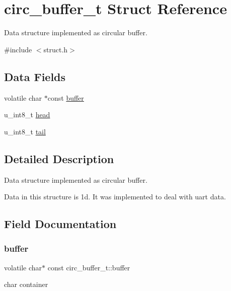 \hypertarget{structcirc__buffer__t}{}\section{circ\+\_\+buffer\+\_\+t Struct Reference}
\label{structcirc__buffer__t}


Data structure implemented as circular buffer.  




{\ttfamily \#include $<$struct.\+h$>$}

\subsection*{Data Fields}
\begin{DoxyCompactItemize}
\item 
volatile char $\ast$const \hyperlink{structcirc__buffer__t_aa817597980b60e12f1fff8a95496564c}{buffer}
\item 
u\+\_\+int8\+\_\+t \hyperlink{structcirc__buffer__t_aef8f62f80f1f898826f8289c3c8ee3e1}{head}
\item 
u\+\_\+int8\+\_\+t \hyperlink{structcirc__buffer__t_ac263e578598ba3ca3c25af3977450e27}{tail}
\end{DoxyCompactItemize}


\subsection{Detailed Description}
Data structure implemented as circular buffer. 

Data in this structure is 1d. It was implemented to deal with uart data. 

\subsection{Field Documentation}
\mbox{\label{structcirc__buffer__t_aa817597980b60e12f1fff8a95496564c}} 
\subsubsection{\texorpdfstring{buffer}{buffer}}
{\footnotesize\ttfamily volatile char$\ast$ const circ\+\_\+buffer\+\_\+t\+::buffer}

char container \mbox{\label{structcirc__buffer__t_aef8f62f80f1f898826f8289c3c8ee3e1}} 
